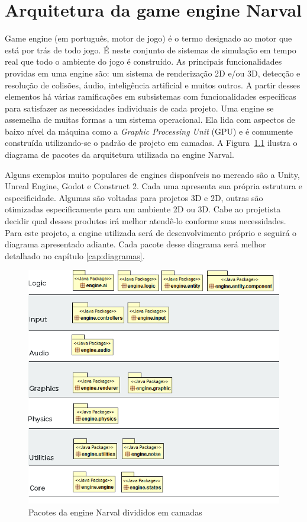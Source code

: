 \documentclass[12pt, 
openright, 
oneside, 
a4paper,    
brazil]{facom-ufu-abntex2}
\begin{document}
\chapter{Arquitetura da game engine Narval}
\label{cap:gameEngine}
Game engine (em português, motor de jogo) é o termo designado ao motor que está por trás de todo jogo. É neste conjunto de sistemas de simulação em tempo real que todo o ambiente do jogo é construído. As principais funcionalidades providas em uma engine são: um sistema de renderização 2D e/ou 3D, detecção e resolução de colisões, áudio, inteligência artificial e muitos outros. A partir desses elementos há várias ramificações em subsistemas com funcionalidades específicas para satisfazer as necessidades individuais de cada projeto. Uma engine se assemelha de muitas formas a um sistema operacional. Ela lida com aspectos de baixo nível da máquina como a \textit{Graphic Processing Unit} (GPU) e é comumente construída utilizando-se o padrão de projeto em camadas. A Figura~\ref{fig:arquitetura}  ilustra o diagrama de pacotes da arquitetura utilizada na engine Narval.

Alguns exemplos muito populares de engines disponíveis no mercado são a Unity, Unreal Engine, Godot e Construct 2. Cada uma apresenta sua própria estrutura e especificidade. Algumas são voltadas para projetos 3D e 2D, outras são otimizadas especificamente para um ambiente 2D ou 3D. Cabe ao projetista decidir qual desses produtos irá melhor atendê-lo conforme suas necessidades. Para este projeto, a engine utilizada será de desenvolvimento próprio e seguirá o diagrama apresentado adiante. Cada pacote desse diagrama será melhor detalhado no capítulo \ref{cap:diagramas}.




\begin{figure}[H]
	\centering
	\includegraphics[width=\textwidth]{imagens/engineLayers.png}
	\caption{Pacotes da engine Narval divididos em camadas
    \label{fig:arquitetura}}
\end{figure}
\end{document}
